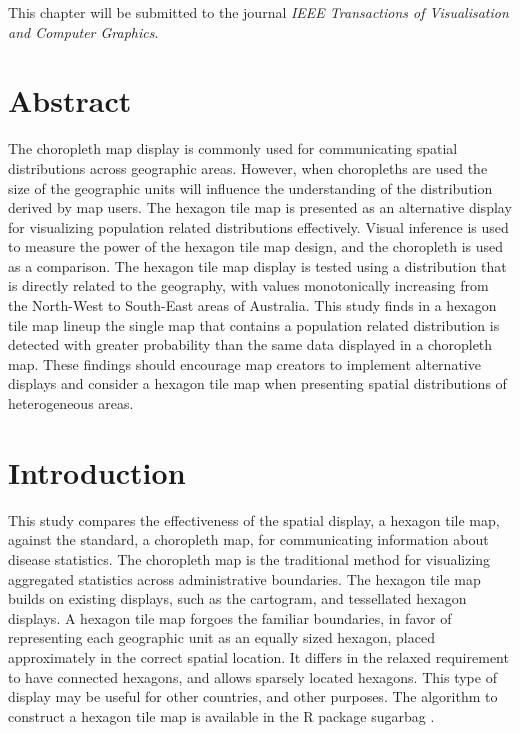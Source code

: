 \documentclass{monashthesis}
\begin{document}
This chapter will be submitted to the journal \emph{IEEE Transactions of Visualisation and Computer Graphics}.

\hypertarget{abstract-3}{%
\section*{Abstract}\label{abstract-3}}

The choropleth map display is commonly used for communicating spatial distributions across geographic areas. However, when choropleths are used the size of the geographic units will influence the understanding of the distribution derived by map users. The hexagon tile map is presented as an alternative display for visualizing population related distributions effectively. Visual inference is used to measure the power of the hexagon tile map design, and the choropleth is used as a comparison. The hexagon tile map display is tested using a distribution that is directly related to the geography, with values monotonically increasing from the North-West to South-East areas of Australia. This study finds in a hexagon tile map lineup the single map that contains a population related distribution is detected with greater probability than the same data displayed in a choropleth map. These findings should encourage map creators to implement alternative displays and consider a hexagon tile map when presenting spatial distributions of heterogeneous areas.

\hypertarget{introduction-2}{%
\section{Introduction}\label{introduction-2}}

This study compares the effectiveness of the spatial display, a hexagon tile map, against the standard, a choropleth map, for communicating information about disease statistics. The choropleth map is the traditional method for visualizing aggregated statistics across administrative boundaries. The hexagon tile map builds on existing displays, such as the cartogram, and tessellated hexagon displays. A hexagon tile map forgoes the familiar boundaries, in favor of representing each geographic unit as an equally sized hexagon, placed approximately in the correct spatial location. It differs in the relaxed requirement to have connected hexagons, and allows sparsely located hexagons. This type of display may be useful for other countries, and other purposes. The algorithm to construct a hexagon tile map is available in the R package sugarbag \autocite{sugarbag}.
\end{document}
